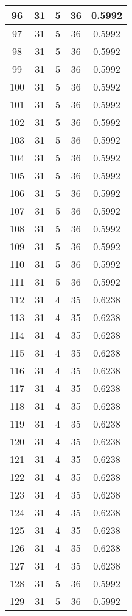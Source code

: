 \documentclass[letterpaper, 12pt]{article}
\begin{document}
\begin{longtable}{|c|c|c|c|c|}
\hline
96 & 31 & 5 & 36 & 0.5992 \\
\hline
97 & 31 & 5 & 36 & 0.5992 \\
\hline
98 & 31 & 5 & 36 & 0.5992 \\
\hline
99 & 31 & 5 & 36 & 0.5992 \\
\hline
100 & 31 & 5 & 36 & 0.5992 \\
\hline
101 & 31 & 5 & 36 & 0.5992 \\
\hline
102 & 31 & 5 & 36 & 0.5992 \\
\hline
103 & 31 & 5 & 36 & 0.5992 \\
\hline
104 & 31 & 5 & 36 & 0.5992 \\
\hline
105 & 31 & 5 & 36 & 0.5992 \\
\hline
106 & 31 & 5 & 36 & 0.5992 \\
\hline
107 & 31 & 5 & 36 & 0.5992 \\
\hline
108 & 31 & 5 & 36 & 0.5992 \\
\hline
109 & 31 & 5 & 36 & 0.5992 \\
\hline
110 & 31 & 5 & 36 & 0.5992 \\
\hline
111 & 31 & 5 & 36 & 0.5992 \\
\hline
112 & 31 & 4 & 35 & 0.6238 \\
\hline
113 & 31 & 4 & 35 & 0.6238 \\
\hline
114 & 31 & 4 & 35 & 0.6238 \\
\hline
115 & 31 & 4 & 35 & 0.6238 \\
\hline
116 & 31 & 4 & 35 & 0.6238 \\
\hline
117 & 31 & 4 & 35 & 0.6238 \\
\hline
118 & 31 & 4 & 35 & 0.6238 \\
\hline
119 & 31 & 4 & 35 & 0.6238 \\
\hline
120 & 31 & 4 & 35 & 0.6238 \\
\hline
121 & 31 & 4 & 35 & 0.6238 \\
\hline
122 & 31 & 4 & 35 & 0.6238 \\
\hline
123 & 31 & 4 & 35 & 0.6238 \\
\hline
124 & 31 & 4 & 35 & 0.6238 \\
\hline
125 & 31 & 4 & 35 & 0.6238 \\
\hline
126 & 31 & 4 & 35 & 0.6238 \\
\hline
127 & 31 & 4 & 35 & 0.6238 \\
\hline
128 & 31 & 5 & 36 & 0.5992 \\
\hline
129 & 31 & 5 & 36 & 0.5992 \\

\end{longtable}
\end{document}
